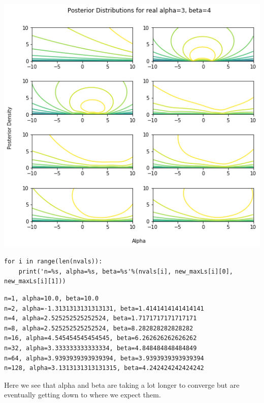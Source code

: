 \documentclass[11pt]{article}
\begin{document}
\includegraphics[width=.9\linewidth]{./obipy-resources/3227Vi.png}


\begin{verbatim}
for i in range(len(nvals)):
    print('n=%s, alpha=%s, beta=%s'%(nvals[i], new_maxLs[i][0], new_maxLs[i][1]))
\end{verbatim}

\begin{verbatim}
n=1, alpha=10.0, beta=10.0
n=2, alpha=-1.3131313131313131, beta=1.4141414141414141
n=4, alpha=2.525252525252524, beta=1.7171717171717171
n=8, alpha=2.525252525252524, beta=8.282828282828282
n=16, alpha=4.545454545454545, beta=6.262626262626262
n=32, alpha=3.333333333333334, beta=4.848484848484849
n=64, alpha=3.9393939393939394, beta=3.9393939393939394
n=128, alpha=3.1313131313131315, beta=4.242424242424242
\end{verbatim}

Here we see that alpha and beta are taking a lot longer to converge but are
eventually getting down to where we expect them.
\end{document}

